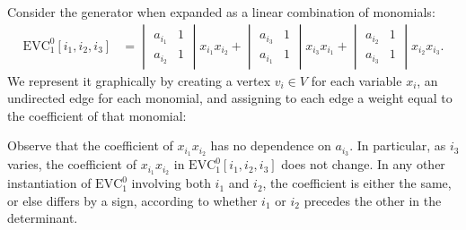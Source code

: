 \documentclass[11pt]{article}
\numberwithin{equation}{section}
\theoremstyle{definition}
\theoremstyle{plain}
\newcommand{\VanGen}{{\ensuremath{\mathrm{EVC}}}}
\newcommand{\VanGenparam}[2]{{\ensuremath{\VanGen^{#1}_{#2}}}}
\newcommand{\Vertices}{\ensuremath{V}}
\begin{document}
Consider the generator when expanded as a linear combination of monomials:
\begin{align*}
  \VanGenparam{0}{1}[i_1, i_2, i_3]
  &=
  \begin{vmatrix}
    a_{i_1} & 1 \\
    a_{i_2} & 1
  \end{vmatrix}x_{i_1} x_{i_2}
  +
  \begin{vmatrix}
    a_{i_3} & 1 \\
    a_{i_1} & 1
  \end{vmatrix}x_{i_3} x_{i_1}
  +
  \begin{vmatrix}
    a_{i_2} & 1 \\
    a_{i_3} & 1
  \end{vmatrix}x_{i_2} x_{i_3}.
\end{align*}
We represent it graphically by creating a vertex $v_i \in \Vertices$ for each variable $x_i$, an
undirected edge for each monomial, and assigning to each edge a weight
equal to the coefficient of that monomial:
\begin{center}
\end{center}
Observe that the coefficient of \(x_{i_1}x_{i_2}\) has no dependence on
\(a_{i_3}\).
In particular, as \(i_3\) varies,
the coefficient of \(x_{i_1}x_{i_2}\) in \(\VanGenparam{0}{1}[i_1, i_2, i_3]\)
does not change.
In any other instantiation of \(\VanGenparam{0}{1}\) involving both
\(i_1\) and \(i_2\), the coefficient is either the same, or else differs by
a sign,
according to whether \(i_1\) or \(i_2\) precedes the other in the determinant.
\end{document}
